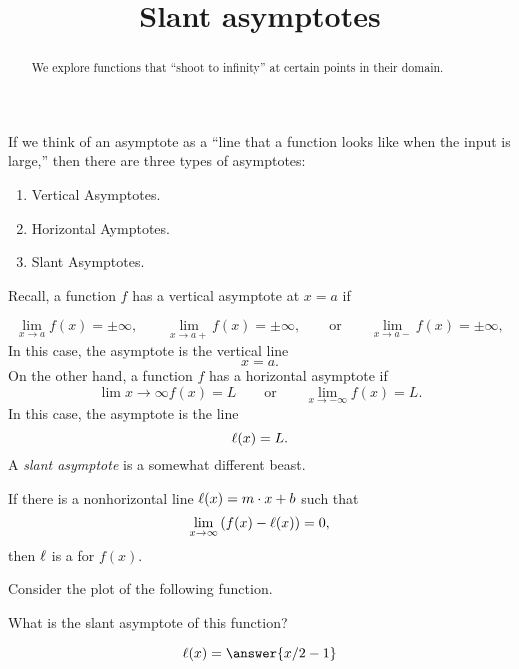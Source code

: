 \documentclass{ximera}
\title[Dig-In:]{Slant asymptotes}
\begin{document}
\begin{abstract}
We explore functions that ``shoot to infinity'' at certain points in
their domain.
\end{abstract}
\maketitle

If we think of an asymptote as a ``line that a function looks like
when the input is large,'' then there are three types of asymptotes:
\begin{enumerate}
\item Vertical Asymptotes.
\item Horizontal Aymptotes.
\item Slant Asymptotes.
\end{enumerate}

Recall, a function $f$ has a vertical asymptote at $x=a$ if

\[
\lim_{x\to a} f(x) = \pm\infty, \qquad \lim_{x\to a+} f(x) = \pm\infty, \qquad\text{or}\qquad \lim_{x\to a-} f(x) = \pm\infty,
\]
In this case, the asymptote is the vertical line
\[
x = a.
\]
On the other hand, a function $f$ has a horizontal asymptote if
\[
\lim{x\to \infty} f(x) = L \qquad\text{or}\qquad \lim_{x\to -\infty}
f(x) = L.
\]
In this case, the asymptote is the line
\[
\ell(x) = L.
\]
A \textit{slant asymptote} is a somewhat different beast.

\begin{definition}
  If there is a nonhorizontal line $\ell(x) = m\cdot x+b$ such that
  \[
  \lim_{x\to \infty}\left(f(x) - \l(x)\right) = 0,
  \]
  then $\ell$ is a  for $f(x)$.
\end{definition}
\begin{question}
  Consider the plot of the following function. 
  \begin{image}
  \end{image}
  What is the slant asymptote of this function?
  \begin{prompt}
    \[
    \l(x) = \answer{x/2 -1}
    \]
  \end{prompt}
\end{question}
\end{document}
